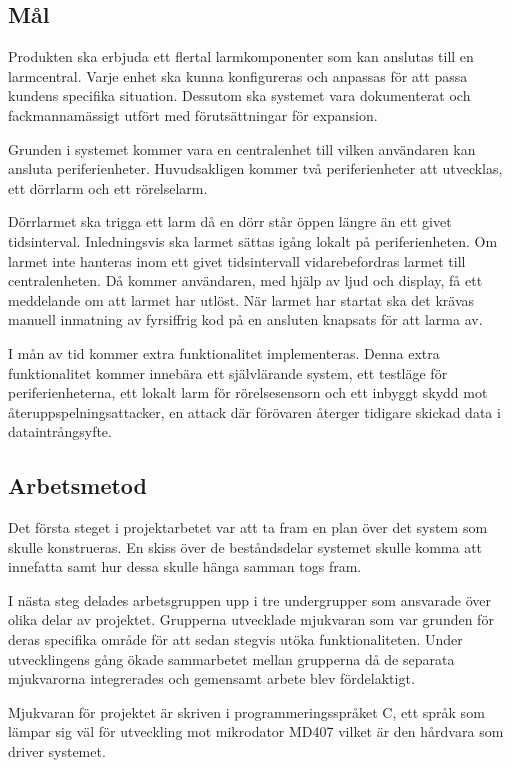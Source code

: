 \documentclass[a4paper]{article}
\begin{document}
\subsection{Mål}

Produkten ska erbjuda ett flertal larmkomponenter som kan anslutas till en larmcentral. Varje enhet ska kunna konfigureras och anpassas för att passa kundens specifika situation.
Dessutom ska systemet vara dokumenterat och fackmannamässigt utfört med förutsättningar för expansion.

Grunden i systemet kommer vara en centralenhet till vilken användaren kan ansluta periferienheter.
Huvudsakligen kommer två periferienheter att utvecklas, ett dörrlarm och ett rörelselarm.

Dörrlarmet ska trigga ett larm då en dörr står öppen längre än ett givet tidsinterval.
Inledningsvis ska larmet sättas igång lokalt på periferienheten.
Om larmet inte hanteras inom ett givet tidsintervall vidarebefordras larmet till centralenheten.
Då kommer användaren, med hjälp av ljud och display, få ett meddelande om att larmet har utlöst.
När larmet har startat ska det krävas manuell inmatning av fyrsiffrig kod på en ansluten knapsats för att larma av.

I mån av tid kommer extra funktionalitet implementeras.
Denna extra funktionalitet kommer innebära ett självlärande system, ett testläge för periferienheterna, ett lokalt larm för rörelsesensorn och ett inbyggt skydd mot återuppspelningsattacker, en attack där förövaren återger tidigare skickad data i dataintrångsyfte.


\subsection{Arbetsmetod}

Det första steget i projektarbetet var att ta fram en plan över det system som skulle konstrueras.
En skiss över de beståndsdelar systemet skulle komma att innefatta samt hur dessa skulle hänga samman togs fram.

I nästa steg delades arbetsgruppen upp i tre undergrupper  som ansvarade över olika delar av projektet.
Grupperna utvecklade mjukvaran som var grunden för deras specifika område för att sedan stegvis utöka funktionaliteten.
Under utvecklingens gång ökade sammarbetet mellan grupperna då de separata mjukvarorna integrerades och gemensamt arbete blev fördelaktigt.

Mjukvaran för projektet är skriven i programmeringsspråket C, ett språk som lämpar sig väl för utveckling mot mikrodator MD407 vilket är den hårdvara som driver systemet.
\end{document}
